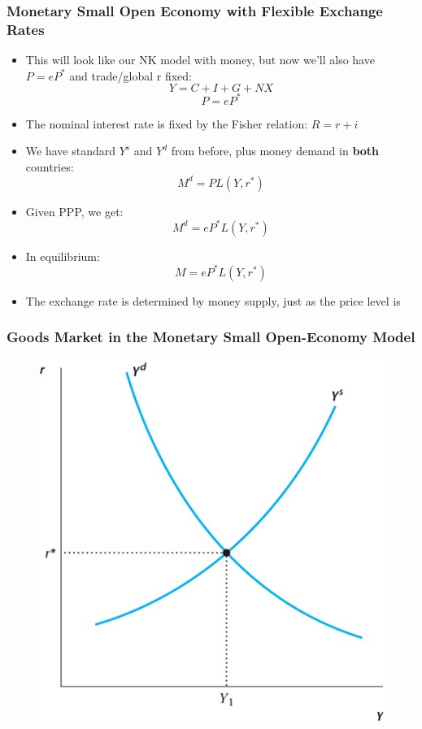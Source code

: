 \documentclass{beamer}
\begin{document}
\begin{frame}
\frametitle[alignment=center]{Monetary Small Open Economy with Flexible Exchange Rates}
\begin{itemize}
\item This will look like our NK model with money, but now we'll also have $P=eP^*$ and trade/global r fixed:
$$Y=C+I+G+NX$$
$$P=eP^*$$
\item The nominal interest rate is fixed by the Fisher relation: $R=r+i$
\item We have standard $Y^s$ and $Y^d$ from before, plus money demand in \textbf{both} countries:
$$M^d=PL(Y,r^*)$$
\item Given PPP, we get:
$$M^d=eP^*L(Y,r^*)$$
\item In equilibrium:
$$M=eP^*L(Y,r^*)$$
\item The exchange rate is determined by money supply, just as the price level is
\end{itemize}
\end{frame}

\begin{frame}
\frametitle[alignment=center]{Goods Market in the Monetary Small Open-Economy Model}
\begin{figure}
\centering
\includegraphics[scale=0.75]{Figures/W_Fig_17pt2.png}
\end{figure}
\end{frame}
\end{document}
